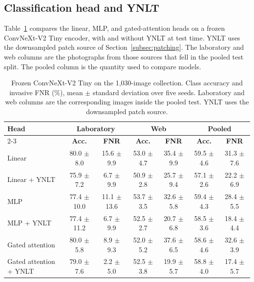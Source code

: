 \documentclass[final,3p,times,twocolumn]{elsarticle}
\begin{document}
\subsection{Classification head and YNLT}
\label{subsec:heads}

Table~\ref{tab:heads} compares the linear, MLP, and gated-attention heads on a frozen ConvNeXt-V2 Tiny encoder, with and without YNLT at test time. YNLT uses the downsampled patch source of Section~\ref{subsec:patching}. The laboratory and web columns are the photographs from those sources that fell in the pooled test split. The pooled column is the quantity used to compare models.

\begin{table}[!ht]
    \caption{Frozen ConvNeXt-V2 Tiny on the 1{,}030-image collection. Class accuracy and invasive FNR (\%), mean \(\pm\) standard deviation over five seeds. Laboratory and web columns are the corresponding images inside the pooled test. YNLT uses the downsampled patch source.}
    \label{tab:heads}
    \renewcommand{\arraystretch}{1.25}
    \centering
    \small
    \begin{tabular}{lcccccc}
        \hline
        \multirow{2}{*}{\textbf{Head}} & \multicolumn{2}{c}{\textbf{Laboratory}} & \multicolumn{2}{c}{\textbf{Web}} & \multicolumn{2}{c}{\textbf{Pooled}} \\
        \cline{2-3} \cline{4-5} \cline{6-7}
        & \textbf{Acc.} & \textbf{FNR} & \textbf{Acc.} & \textbf{FNR} & \textbf{Acc.} & \textbf{FNR} \\
        \hline
        Linear & 80.0 $\pm$ 8.0 & 15.6 $\pm$ 9.9 & 53.0 $\pm$ 4.7 & 35.4 $\pm$ 9.9 & 59.5 $\pm$ 4.6 & 31.3 $\pm$ 7.6 \\
        Linear + YNLT & 75.9 $\pm$ 7.2 & 6.7 $\pm$ 9.9 & 50.9 $\pm$ 2.8 & 25.7 $\pm$ 9.4 & 57.1 $\pm$ 2.6 & 22.2 $\pm$ 6.9 \\
        MLP & 77.4 $\pm$ 10.0 & 11.1 $\pm$ 13.6 & 53.7 $\pm$ 3.5 & 32.6 $\pm$ 5.8 & 59.4 $\pm$ 4.3 & 28.4 $\pm$ 5.5 \\
        MLP + YNLT & 77.4 $\pm$ 11.2 & 6.7 $\pm$ 9.9 & 52.5 $\pm$ 2.7 & 20.7 $\pm$ 6.8 & 58.5 $\pm$ 3.6 & 18.4 $\pm$ 4.4 \\
        Gated attention & 80.0 $\pm$ 5.8 & 8.9 $\pm$ 9.3 & 52.0 $\pm$ 5.2 & 37.6 $\pm$ 6.5 & 58.6 $\pm$ 4.6 & 32.6 $\pm$ 3.9 \\
        Gated attention + YNLT & 79.0 $\pm$ 7.6 & 2.2 $\pm$ 5.0 & 52.5 $\pm$ 3.8 & 19.9 $\pm$ 5.7 & 58.8 $\pm$ 4.0 & 17.4 $\pm$ 5.7 \\
        \hline
    \end{tabular}
\end{table}
\end{document}
